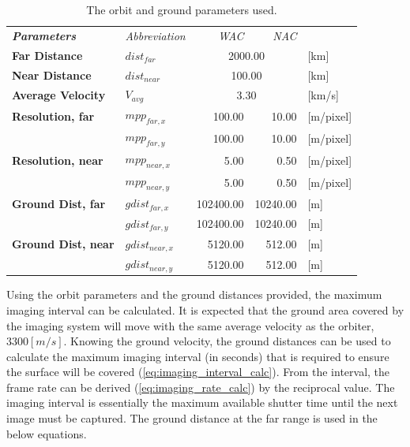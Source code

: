 \begin{table}[htb!]
  \centering
    \begin{tabular}{l|l|r|r|l}
\textit{\textbf{Parameters}} & \textit{Abbreviation} & \multicolumn{1}{r}{\textit{WAC}} & \multicolumn{1}{r}{\textit{NAC}} &  \bigstrut[b]\\
\cline{1-4}\textbf{Far Distance} & $dist_{far}$ & \multicolumn{2}{c|}{2000.00} & [km] \bigstrut[t]\\
\textbf{Near Distance} & $dist_{near}$ & \multicolumn{2}{c|}{100.00} & [km] \\
\textbf{Average Velocity} & $V_{avg}$ & \multicolumn{2}{c|}{3.30} & [km/s] \bigstrut[b]\\
\cline{1-4}\textbf{Resolution, far} & $mpp_{far,x}$ & 100.00 & 10.00 & [m/pixel] \bigstrut[t]\\
      & $mpp_{far,y}$ & 100.00 & 10.00 & [m/pixel] \bigstrut[b]\\
\cline{2-4}\textbf{Resolution, near} & $mpp_{near,x}$ & 5.00  & 0.50  & [m/pixel] \bigstrut[t]\\
      & $mpp_{near,y}$ & 5.00  & 0.50  & [m/pixel] \bigstrut[b]\\
\cline{1-4}\textbf{Ground Dist, far} & $gdist_{far,x}$ & 102400.00 & 10240.00 & [m] \bigstrut[t]\\
      & $gdist_{far,y}$ & 102400.00 & 10240.00 & [m] \bigstrut[b]\\
\cline{2-4}\textbf{Ground Dist, near} & $gdist_{near,x}$ & 5120.00 & 512.00 & [m] \bigstrut[t]\\
      & $gdist_{near,y}$ & 5120.00 & 512.00 & [m] \\
\end{tabular}%
  \caption{The orbit and ground parameters used.}
  \label{tab:imaging_parameters}%
\end{table}%
Using the orbit parameters and the ground distances provided, the maximum imaging interval can be calculated. It is expected that the ground area covered by the imaging system will move with the same average velocity as the orbiter, $3300 [m/s]$. Knowing the ground velocity, the ground distances can be used to calculate the maximum imaging interval (in seconds) that is required to ensure the surface will be covered (\ref{eq:imaging_interval_calc}). From the interval, the frame rate can be derived (\ref{eq:imaging_rate_calc}) by the reciprocal value. The imaging interval is essentially the maximum available shutter time until the next image must be captured. The ground distance at the far range is used in the below equations.
